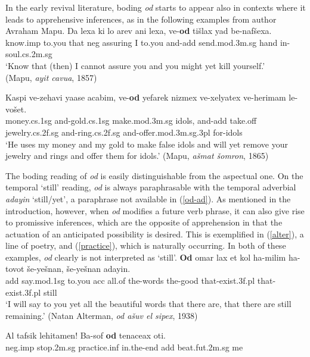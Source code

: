 \documentclass[output=paper,colorlinks,citecolor=brown]{langscibook}
\begin{document}
In the early revival literature, boding \textit{od} starts to appear also in contexts where it leads to apprehensive inferences, as in the following examples from author Avraham Mapu. 
\ea
\gll Da lexa ki lo arev ani lexa, ve-\textbf{od} tišlax yad be-nafšexa. \\
know.{\sc imp} to.you that {\sc neg} assuring I to.you and-{\sc add} send.{\sc mod.3m.sg} hand in-soul.{\sc cs.2m.sg} \\
\glt `Know that (then) I cannot assure you and you might yet kill yourself.' \\(Mapu, \textit{ayit cavua}, 1857)
\z

\ea
\gll Kaspi ve-zehavi yaase acabim, ve-\textbf{od} yefarek nizmex ve-xelyatex ve-herimam le-vošet. \\
money.{\sc cs.1sg} and-gold.{\sc cs.1sg} make.{\sc mod.3m.sg} idols, and-{\sc add} take.off jewelry.{\sc cs.2f.sg} and-ring.{\sc cs.2f.sg} and-offer.{\sc mod.3m.sg.3pl} for-idols\\
\glt `He uses my money and my gold to make false idols and will yet remove your jewelry and rings and offer them for idols.' (Mapu, \textit{ašmat šomron}, 1865)
\z

The boding reading of \textit{od} is easily distinguishable from the aspectual one. On the temporal  `still' reading, \textit{od} is always paraphrasable with the temporal adverbial \textit{adayin} `still/yet', a paraphrase not available in (\ref{od-ad}). As mentioned in the introduction, however, when \textit{od} modifies a future verb phrase, it can also give rise to promissive inferences, which are the opposite of apprehension in that the actuation of an anticipated possibility is desired. This is exemplified in (\ref{alter}), a line of poetry, and (\ref{practice}), which is naturally occurring. In both of these examples, \textit{od} clearly is not interpreted as `still'. 
\ea
\label{alter}
\gll \textbf{Od} omar lax et kol ha-milim ha-tovot še-yešnan, še-yešnan adayin. \\
{\sc add} say.{\sc mod.1sg} to.you {\sc acc} all.of the-words the-good that-exist.{\sc 3f.pl} that-exist.{\sc 3f.pl} still \\
\glt  `I will say to you yet all the beautiful words that there are, that there are still remaining.' (Natan Alterman, \textit{od ašuv el sipex}, 1938)
\z

\ea
\label{practice}
\gll Al tafsik lehitamen! Ba-sof \textbf{od} tenaceax oti. \\
{\sc neg.imp} stop.{\sc 2m.sg} practice.{\sc inf} in.the-end {\sc add} beat.{\sc fut.2m.sg} me\\
\end{document}
